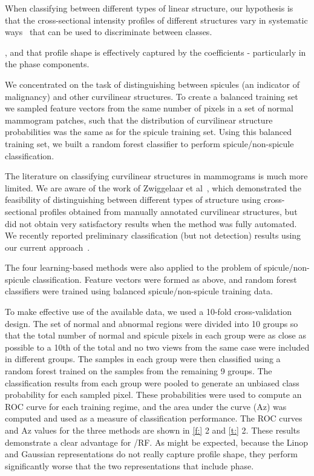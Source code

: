 When classifying between different types of linear structure, our hypothesis is that the cross-sectional intensity profiles of different structures vary in systematic ways~\cite{Zwiggelaar_etal_TMI04} that can be used to discriminate between classes.

, and that profile shape is effectively captured by the \dtcwt coefficients - particularly in the phase components. 

We concentrated on the task of distinguishing between spicules (an indicator of malignancy) and other curvilinear structures.  To create a balanced training set we sampled feature vectors from the same number of pixels in a set of normal mammogram patches, such that the distribution of curvilinear structure probabilities was the same as for the spicule training set. Using this balanced training set, we built a random forest classifier to perform spicule/non-spicule classification.

The literature on classifying curvilinear structures in mammograms is much more limited. We are aware of the work of Zwiggelaar et al~\cite{Zwiggelaar_etal_TMI04}, which demonstrated the feasibility of distinguishing between different types of structure using cross-sectional profiles obtained from manually annotated curvilinear structures, but did not obtain very satisfactory results when the method was fully automated.  We recently reported preliminary classification (but not detection) results using our current approach~\cite{Chen_etal_IWDM10}.


The four learning-based methods were also applied to the problem of spicule/non-spicule classification. Feature vectors were formed as above, and random forest classifiers were trained using balanced spicule/non-spicule training data.

To make effective use of the available data, we used a 10-fold cross-validation design. The set of normal and abnormal regions were divided into 10 groups so that the total number of normal and spicule pixels in each group were as close as possible to a 10th of the total and no two views from the same case were included in different groups. The samples in each group were then classified using a random forest trained on the samples from the remaining 9 groups. The classification results from each group were pooled to generate an unbiased class probability for each sampled pixel. These probabilities were used to compute an ROC curve for each training regime, and the area under the curve (Az) was computed and used as a measure of classification performance. The ROC curves and Az values for the three methods are shown in \ref{f:} 2 and \ref{t:} 2. These results demonstrate a clear advantage for \dtcwt/RF. As might be expected, because the Linop and Gaussian representations do not really capture profile shape, they perform significantly worse that the two representations that include phase.

